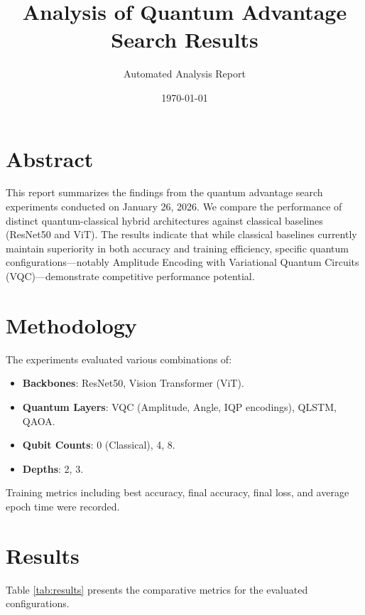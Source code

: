 \documentclass{article}
\title{Analysis of Quantum Advantage Search Results}
\author{Automated Analysis Report}
\date{\today}
\begin{document}
\maketitle

\section{Abstract}
This report summarizes the findings from the quantum advantage search experiments conducted on January 26, 2026. We compare the performance of distinct quantum-classical hybrid architectures against classical baselines (ResNet50 and ViT). The results indicate that while classical baselines currently maintain superiority in both accuracy and training efficiency, specific quantum configurations—notably Amplitude Encoding with Variational Quantum Circuits (VQC)—demonstrate competitive performance potential.

\section{Methodology}
The experiments evaluated various combinations of:
\begin{itemize}
    \item \textbf{Backbones}: ResNet50, Vision Transformer (ViT).
    \item \textbf{Quantum Layers}: VQC (Amplitude, Angle, IQP encodings), QLSTM, QAOA.
    \item \textbf{Qubit Counts}: 0 (Classical), 4, 8.
    \item \textbf{Depths}: 2, 3.
\end{itemize}
Training metrics including best accuracy, final accuracy, final loss, and average epoch time were recorded.

\section{Results}
Table \ref{tab:results} presents the comparative metrics for the evaluated configurations.
\end{document}

